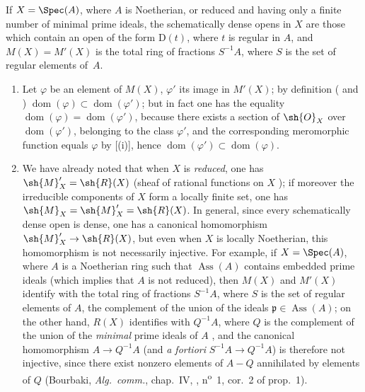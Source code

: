 \begin{corollary}[20.2.12]
\label{IV.20.2.12}
If $X=\Spec(A)$, where $A$ is Noetherian, or reduced and having only a finite number of minimal prime ideals, the schematically dense opens in $X$ are those which contain an open of the form $\mathrm{D}(t)$, where $t$ is regular in $A$, and $M(X)=M'(X)$ is the total ring of fractions $S^{-1}A$, where $S$ is the set of regular elements of~$A$.
\end{corollary}

\begin{remarks}[20.2.13]
\label{IV.20.2.13}
\begin{enumerate}[label=(\roman*)]
  \item Let $\varphi$ be an element of $M(X)$, $\varphi'$ its image in $M'(X)$;
  by definition ( and ) $\operatorname{dom}(\varphi)\subset\operatorname{dom}(\varphi')$;
  but in fact one has the equality $\operatorname{dom}(\varphi)=\operatorname{dom}(\varphi')$, because there exists a section of $\sh{O}_X$ over $\operatorname{dom}(\varphi')$, belonging to the class $\varphi'$, and the corresponding meromorphic function equals $\varphi$ by [(i)], hence $\operatorname{dom}(\varphi')\subset\operatorname{dom}(\varphi)$.

  \item We have already noted that when $X$ is \emph{reduced}, one has $\sh{M}'_X=\sh{R}(X)$ (sheaf of rational functions on $X$ );
  if moreover the irreducible components of $X$ form a locally finite set, one has $\sh{M}_X=\sh{M}'_X=\sh{R}(X)$.
  In general, since every schematically dense open is dense, one has a canonical homomorphism $\sh{M}'_X\to\sh{R}(X)$, but even when $X$ is locally Noetherian, this homomorphism is not necessarily injective.
  For example, if $X=\Spec(A)$, where $A$ is a Noetherian ring such that $\operatorname{Ass}(A)$ contains embedded prime ideals (which implies that $A$ is not reduced), then $M(X)$ and $M'(X)$ identify with the total ring of fractions $S^{-1}A$,
  where $S$ is the set of regular elements of $A$, the complement of the union of the ideals $\mathfrak{p}\in\operatorname{Ass}(A)$;
  on the other hand, $R(X)$ identifies with $Q^{-1}A$, where $Q$ is the complement of the union of the \emph{minimal} prime ideals of $A$ , and the canonical homomorphism $A\to Q^{-1}A$ (and \emph{a fortiori} $S^{-1}A\to Q^{-1}A$) is therefore not injective, since there exist nonzero elements of $A-Q$ annihilated by elements of $Q$ (Bourbaki, \emph{Alg.~comm.}, chap.~IV, , n\textsuperscript{o}~1, cor.~2 of prop.~1).


\end{enumerate}
\end{remarks}
